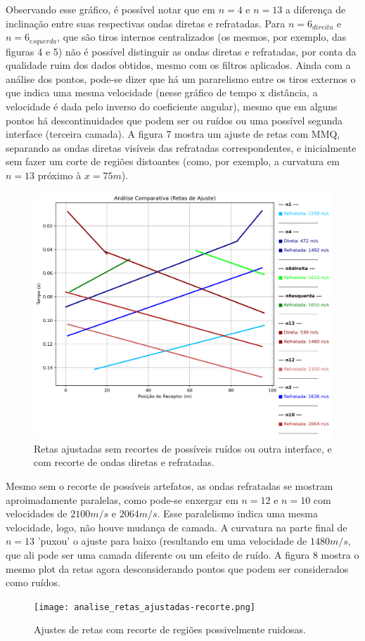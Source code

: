 \documentclass[a4paper,12pt]{article}
\begin{document}
Observando esse gráfico, é possível notar que em $n=4$ e $n=13$ a diferença de inclinação entre suas respectivas ondas diretas e refratadas. Para $n=6_{direita}$ e $n=6_{esquerda}$, que são tiros internos centralizados (os mesmos, por exemplo, das figuras 4 e 5) não é possível distinguir as ondas diretas e refratadas, por conta da qualidade ruim dos dados obtidos, mesmo com os filtros aplicados. Ainda com a análise dos pontos, pode-se dizer que há um pararelismo entre os tiros externos o que indica uma mesma velocidade (nesse gráfico de tempo x distância, a velocidade é dada pelo inverso do coeficiente angular), mesmo que em alguns pontos há descontinuidades que podem ser ou ruídos ou uma possível segunda interface (terceira camada). A figura 7 mostra um ajuste de retas com MMQ, separando as ondas diretas visíveis das refratadas correspondentes, e inicialmente sem fazer um corte de regiões distoantes (como, por exemplo, a curvatura em $n=13$ próximo à $x=75m$).

\begin{figure}[h]
    \centering
    \includegraphics[width=0.5\linewidth]{analise_retas_ajustadas.png}
    \caption{Retas ajustadas sem recortes de possíveis ruídos ou outra interface, e com recorte de ondas diretas e refratadas.}
    \label{fig:placeholder}
\end{figure}

Mesmo sem o recorte de possíveis artefatos, as ondas refratadas se mostram aproimadamente paralelas, como pode-se enxergar em $n=12$ e $n=10$ com velocidades de $2100 m/s$ e $2064 m/s$. Esse paralelismo indica uma mesma velocidade, logo, não houve mudança de camada. A curvatura na parte final de $n=13$ 'puxou' o ajuste para baixo (resultando em uma velocidade de $1480 m/s$, que ali pode ser uma camada diferente ou um efeito de ruído. A figura 8 mostra o mesmo plot da retas agora desconsiderando pontos que podem ser considerados como ruídos.


\begin{figure}[h]
    \centering
    \texttt{[image: analise\_retas\_ajustadas-recorte.png]}
    \caption{Ajustes de retas com recorte de regiões possivelmente ruidosas.}
    \label{fig:placeholder}
\end{figure}
\end{document}
